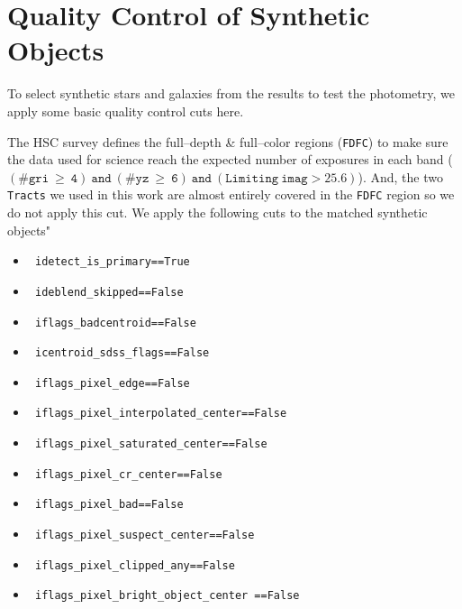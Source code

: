 \documentclass[useamsfonts]{pasj01}
\def\tracts{\texttt{Tracts}}
\begin{document}
\appendix
\section{Quality Control of Synthetic Objects}
    \label{app:qc}

    To select synthetic stars and galaxies from the results to test the photometry,
    we apply some basic quality control cuts here.

    The HSC survey defines the full--depth \& full--color regions (\texttt{FDFC}) to
    make sure the data used for science reach the expected number of exposures in each
    band
    ($\mathtt{(\#gri\ \geq\ 4)\ and\ (\#yz\ \geq\ 6)\ and\ (Limiting\ imag> 25.6)}$).
    And, the two \tracts{} we used in this work are almost entirely covered in
    the \texttt{FDFC} region so we do not apply this cut.
    We apply the following cuts to the matched synthetic objects"

    \begin{itemize}

        \item[ ] \texttt{ idetect\_is\_primary==True }
        \item[ ] \texttt{ ideblend\_skipped==False }
        \item[ ] \texttt{ iflags\_badcentroid==False }
        \item[ ] \texttt{ icentroid\_sdss\_flags==False }
        \item[ ] \texttt{ iflags\_pixel\_edge==False }
        \item[ ] \texttt{ iflags\_pixel\_interpolated\_center==False }
        \item[ ] \texttt{ iflags\_pixel\_saturated\_center==False }
        \item[ ] \texttt{ iflags\_pixel\_cr\_center==False }
        \item[ ] \texttt{ iflags\_pixel\_bad==False }
        \item[ ] \texttt{ iflags\_pixel\_suspect\_center==False }
        \item[ ] \texttt{ iflags\_pixel\_clipped\_any==False }
        \item[ ] \texttt{ iflags\_pixel\_bright\_object\_center ==False }

    \end{itemize}
\end{document}
